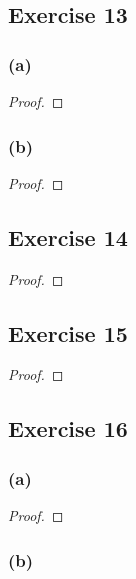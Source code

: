 \documentclass[14pt]{extarticle}
\begin{document}
\subsection{Exercise 13}

\subsubsection{(a)}

\begin{proof}

\end{proof}

\subsubsection{(b)}

\begin{proof}

\end{proof}

\subsection{Exercise 14}

\begin{proof}

\end{proof}

\subsection{Exercise 15}

\begin{proof}

\end{proof}

\subsection{Exercise 16}

\subsubsection{(a)}

\begin{proof}

\end{proof}

\subsubsection{(b)}
\end{document}
